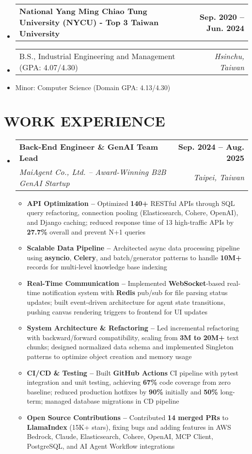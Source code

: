 \documentclass[letterpaper,11pt]{article}
\makeatletter
\newcommand{\resumeItem}[1]{
  \item\small{#1}
}
\newcommand{\resumeSubheadingnull}[2]{
  \item
    \begin{tabular*}{1.0\textwidth}[t]{l@{\extracolsep{\fill}}r}
      \textbf{#1} & \textbf{\small #2} \\
    \end{tabular*}\vspace{3pt}
}
\newcommand{\resumeSubheadinga}[4]{
  \vspace{-3pt}\item
    \begin{tabular*}{1.0\textwidth}[t]{l@{\extracolsep{\fill}}r}
      \textbf{#1} & \textbf{\small #2} \\
      \textit{\small#3} & \textit{\small #4} \\
    \end{tabular*}
}
\newcommand{\resumeSubItema}[2]{
  \item
    \begin{tabular*}{1.0\textwidth}[t]{l@{\extracolsep{\fill}}r}
      \small#1 & \textit{\small #2} \\
    \end{tabular*}
}
\newcommand{\resumeSubItem}[1]{\resumeItem{#1}}
\newcommand{\resumeSubHeadingListStart}{\begin{itemize}[leftmargin=0.0in, label={}]}
\newcommand{\resumeSubHeadingListEnd}{\end{itemize}}
\newcommand{\resumeItemListStart}{\begin{itemize}[label=$\vcenter{\hbox{\tiny$\bullet$}}$]}
\newcommand{\resumeItemListEnd}{\end{itemize}}
\makeatother
\begin{document}
\resumeSubHeadingListStart
\resumeSubheadingnull
{National Yang Ming Chiao Tung University (NYCU) - Top 3 Taiwan University }{Sep. 2020 -- Jun. 2024}
\vspace{-20pt}
\resumeSubItema{B.S., Industrial Engineering and Management (GPA: 4.07/4.30)}{Hsinchu, Taiwan}
\vspace{-15pt}
\resumeSubItem{Minor: Computer Science (Domain GPA: 4.13/4.30)}
\resumeSubHeadingListEnd

\vspace{-6pt}



\section{WORK EXPERIENCE}
\vspace{2pt}
\resumeSubHeadingListStart
\resumeSubheadinga
{Back-End Engineer \& GenAI Team Lead}{Sep. 2024 -- Aug. 2025}
{MaiAgent Co., Ltd. -- Award-Winning B2B GenAI Startup}{Taipei, Taiwan}
\vspace{-6pt}
\resumeItemListStart
\resumeItem{\textbf{API Optimization --} Optimized \textbf{140+} RESTful APIs through SQL query refactoring, connection pooling (Elasticsearch, Cohere, OpenAI), and Django caching; reduced response time of 13 high-traffic APIs by \textbf{27.7\%} overall and prevent N+1 queries}
\resumeItem{\textbf{Scalable Data Pipeline --} Architected async data processing pipeline using \textbf{asyncio}, \textbf{Celery}, and batch/generator patterns to handle \textbf{10M+} records for multi-level knowledge base indexing}
\resumeItem{\textbf{Real-Time Communication --} Implemented \textbf{WebSocket}-based real-time notification system with \textbf{Redis} pub/sub for file parsing status updates; built event-driven architecture for agent state transitions, pushing canvas rendering triggers to frontend for UI updates}
\resumeItem{\textbf{System Architecture \& Refactoring --} Led incremental refactoring with backward/forward compatibility, scaling from \textbf{3M to 20M+} text chunks; designed normalized data schema and implemented Singleton patterns to optimize object creation and memory usage}
\resumeItem{\textbf{CI/CD \& Testing --} Built \textbf{GitHub Actions} CI pipeline with pytest integration and unit testing, achieving \textbf{67\%} code coverage from zero baseline; reduced production hotfixes by \textbf{90\%} initially and \textbf{50\%} long-term; managed database migrations in CD pipeline}
\resumeItem{\textbf{Open Source Contributions --} Contributed \textbf{14 merged PRs} to \textbf{LlamaIndex} (15K+ stars), fixing bugs and adding features in AWS Bedrock, Claude, Elasticsearch, Cohere, OpenAI, MCP Client, PostgreSQL, and AI Agent Workflow integrations}
\resumeItemListEnd
\resumeSubHeadingListEnd
\end{document}

